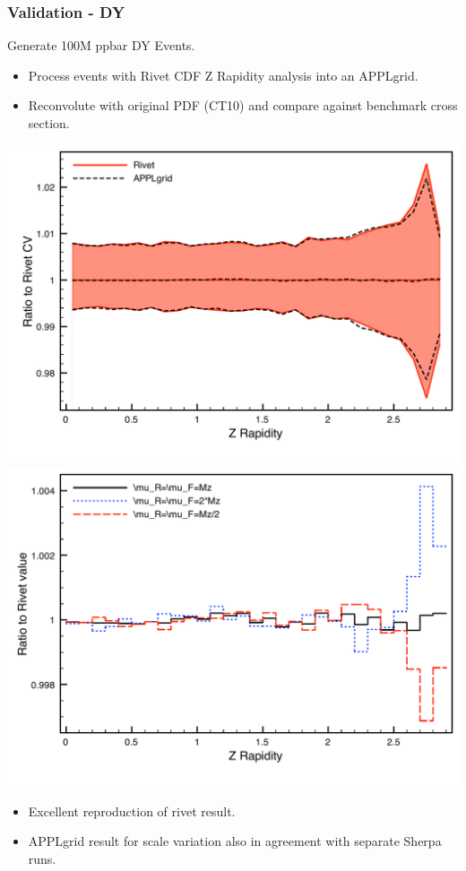 \documentclass[10pt]{beamer}
\begin{document}
\begin{frame}
\frametitle{Validation - DY }
Generate 100M ppbar DY Events.\\
\begin{itemize}
\item<1-> Process events with Rivet CDF Z Rapidity analysis into an APPLgrid.
\item<1-> Reconvolute with original PDF (CT10) and compare against benchmark cross section.
\end{itemize}
\includegraphics[width=0.45\paperwidth]{100MDYScales_Plot.pdf}
\includegraphics[width=0.45\paperwidth]{100MDYRatioScales_Plot.pdf}

\begin{itemize}
\item<1-> Excellent reproduction of rivet result.
\item<1-> APPLgrid result for scale variation also in agreement with separate Sherpa runs.
\end{itemize}
\end{frame}
\end{document}
